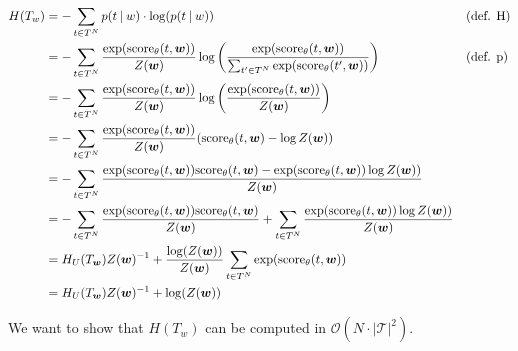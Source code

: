 \documentclass[a4paper,12pt]{ETHexercise}
\begin{document}
\begin{question}
\begin{subquestion}
		\begin{align}
			H(T_w) & = -\sum_{t \in T^{N}} p(t \:|\: w) \cdot \log(p(t \:|\: w))                                                                                                         &  & \text{(def. H)} \\
			       & = -\sum_{t \in T^{N}} \frac{\exp(\text{score}_{\theta}(t, \boldsymbol{w}))}{Z(\boldsymbol{w})} \log \left( \frac{\exp(\text{score}_{\theta}(t, \boldsymbol{w}))}{\sum_{t' \in T^N} \exp(\text{score}_{\theta}(t', \boldsymbol{w}))} \right)                   &  & \text{(def. p)} \\
			       & = -\sum_{t \in T^{N}} \frac{\exp(\text{score}_{\theta}(t, \boldsymbol{w}))}{Z(\boldsymbol{w})} \log \left( \frac{\exp(\text{score}_{\theta}(t, \boldsymbol{w}))}{Z(\boldsymbol{w})} \right)                                                          \\
			       & = -\sum_{t \in T^{N}} \frac{\exp(\text{score}_{\theta}(t, \boldsymbol{w}))}{Z(\boldsymbol{w})} (\text{score}_{\theta}(t, \boldsymbol{w}) - \log Z(\boldsymbol{w}))                                                                                   \\
			       & = -\sum_{t \in T^{N}} \frac{\exp(\text{score}_{\theta}(t, \boldsymbol{w})) \text{score}_{\theta}(t, \boldsymbol{w}) - \exp(\text{score}_{\theta}(t, \boldsymbol{w})) \log Z(\boldsymbol{w}))}{Z(\boldsymbol{w})}                                                                   \\
			       & = -\sum_{t \in T^{N}} \frac{\exp(\text{score}_{\theta}(t, \boldsymbol{w})) \text{score}_{\theta}(t, \boldsymbol{w})}{Z(\boldsymbol{w})} + \sum_{t \in T^{N}} \frac{\exp(\text{score}_{\theta}(t, \boldsymbol{w})) \log Z(\boldsymbol{w}))}{Z(\boldsymbol{w})}                      \\
			       & = H_U(T_{\boldsymbol{w}}) Z(\boldsymbol{w})^{-1}  + \frac{\log(Z(\boldsymbol{w}))}{Z(\boldsymbol{w})} \sum_{t \in T^{N}} \exp(\text{score}_{\theta}(t, \boldsymbol{w}))                                                \\
			       & = H_U(T_{\boldsymbol{w}}) Z(\boldsymbol{w})^{-1}  + \log(Z(\boldsymbol{w}))                                                                                                              \\
		\end{align}
	\end{subquestion}
	\begin{subquestion}
		We want to show that $H(T_w)$ can be computed in $\mathcal{O}(N \cdot |\mathcal{T}|^2)$.\\

\end{subquestion}
\end{question}
\end{document}
